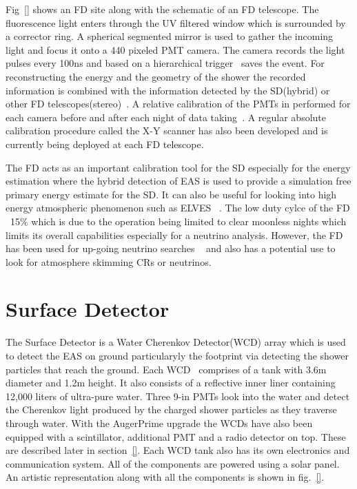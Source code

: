 Fig~\ref{} shows an FD site along with the schematic of an FD telescope. The fluorescence light enters through the UV filtered window 
which is surrounded by a corrector ring. A spherical segmented mirror is used to gather the incoming light and focus it onto a 440 pixeled PMT camera. The camera records the light pulses every 100ns and based on a hierarchical trigger~\cite{} saves the event. For reconstructing the energy and the geometry of the shower the recorded information is combined with the information detected by the SD(hybrid) or other FD telescopes(stereo)~\cite{}. A relative calibration of the PMTs in performed for each camera before and after each night of data taking~\cite{}. A regular absolute calibration procedure called the X-Y scanner has also been developed and is currently being deployed at each FD telescope. 

The FD acts as an important calibration tool for the SD especially for the energy estimation where the hybrid detection of EAS is used to provide a simulation free primary energy estimate for the SD. It can also be useful for looking into high energy atmospheric phenomenon such as ELVES ~\cite{}. The low duty cylce of the FD ~15\% which is due to the operation being limited to clear moonless nights which limits its overall capabilities especially for a neutrino analysis. However, the FD has been used for up-going neutrino searches ~\cite{} and also has a potential use to look for atmosphere skimming CRs or neutrinos.  

\section{Surface Detector}
\label{sec:Sur_det}
The Surface Detector is a Water Cherenkov Detector(WCD) array which is used to detect the EAS on ground particularyly the footprint via detecting the shower particles that reach the ground. Each WCD~\cite{} comprises of a tank with 3.6m diameter and 1.2m height. It also consists of a reflective inner liner containing 12,000 liters of ultra-pure water. Three 9-in PMTs look into the water and detect the Cherenkov light produced by the charged shower particles as they traverse through water. With the AugerPrime upgrade the WCDs have also been equipped with a scintillator, additional PMT and a radio detector on top. These are described later in section~\ref{}. Each WCD tank also has its own electronics and communication system. All of the components are powered using a solar panel. An artistic representation along with all the components is shown in fig.~\ref{}. 

